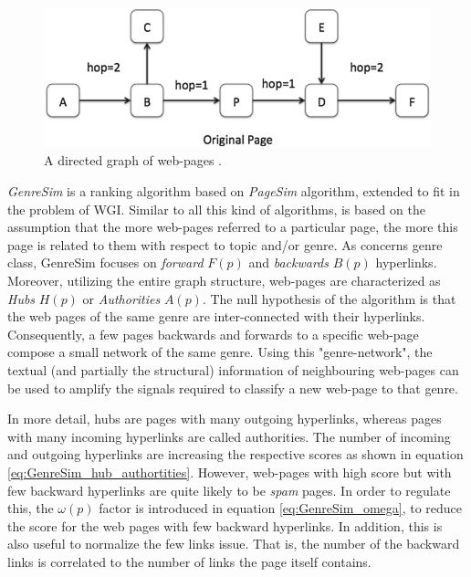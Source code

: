 \begin{figure}[t]
	\begin{center}
    	\includegraphics[scale=0.95]{Figures/GenreSim_Draw.eps}
		\caption{A directed graph of  web-pages \parencite{zhu2016exploiting}.}
		\label{fig:GenreSim_Draw}
	\end{center}
\end{figure}

\textit{GenreSim} is a ranking algorithm based on \textit{PageSim} algorithm, extended to fit in the problem of WGI. Similar to all this kind of algorithms, is based on the assumption that the more web-pages referred to a particular page, the more this page is related to them with respect to topic and/or genre. As concerns genre class, GenreSim focuses on \textit{forward} $F(p)$ and \textit{backwards} $B(p)$ hyperlinks. Moreover, utilizing the entire graph structure, web-pages are characterized as \textit{Hubs} $H(p)$ or \textit{Authorities} $A(p)$. The null hypothesis of the algorithm is that the web pages of the same genre are inter-connected with their hyperlinks. Consequently, a few pages backwards and forwards to a specific web-page compose a small network of the same genre. Using this "genre-network", the textual (and partially the structural) information of neighbouring web-pages can be used to amplify the signals required to classify a new web-page to that genre.

In more detail, hubs are pages with many outgoing hyperlinks, whereas pages with many incoming hyperlinks are called authorities. The number of incoming and outgoing hyperlinks are increasing the respective scores as shown in equation \ref{eq:GenreSim_hub_authortities}. However, web-pages with high score but with few backward hyperlinks are quite likely to be \textit{spam} pages. In order to regulate this, the $\omega(p)$ factor is introduced in equation \ref{eq:GenreSim_omega}, to reduce the score for the web pages with few backward hyperlinks. In addition, this is also useful to normalize the few links issue. That is, the number of the backward links is correlated to the number of links the page itself contains. 

